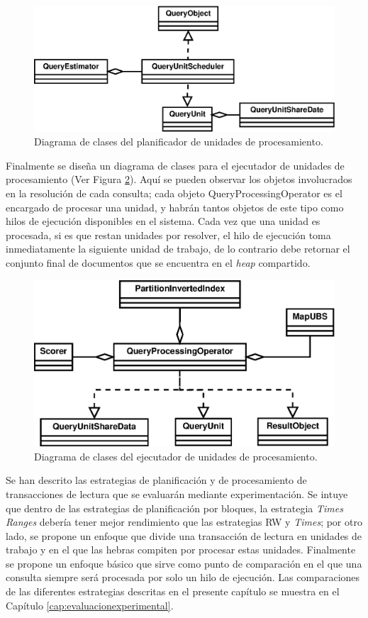 \begin{figure}[!th]
\centering
\includegraphics[scale=.75]{images/QueryUnitScheduler.eps}
\caption{Diagrama de clases del planificador de unidades de procesamiento.}
\label{fig:queryunit_scheduler}
\end{figure}


Finalmente se diseña un diagrama de clases para el ejecutador de unidades de procesamiento (Ver Figura \ref{fig:queryunit_executer}). Aquí se pueden observar los objetos involucrados en la resolución de cada consulta; cada objeto QueryProcessingOperator es el encargado de procesar una unidad, y habrán tantos objetos de este tipo como hilos de ejecución disponibles en el sistema. Cada vez que una unidad es procesada, si es que restan unidades por resolver, el hilo de ejecución toma inmediatamente la siguiente unidad de trabajo, de lo contrario debe retornar el conjunto final de documentos que se encuentra en el \textit{heap} compartido. 

\begin{figure}[!th]
\centering
\includegraphics[scale=.75]{images/QueryUnitExecuter.eps}
\caption{Diagrama de clases del ejecutador de unidades de procesamiento.}
\label{fig:queryunit_executer}
\end{figure}


Se han descrito las estrategias de planificación y de procesamiento de transacciones de lectura que se evaluarán mediante experimentación. Se intuye que dentro de las estrategias de planificación por bloques, la estrategia \textit{Times Ranges} debería tener mejor rendimiento que las estrategias RW y \textit{Times}; por otro lado, se propone un enfoque que divide una transacción de lectura en unidades de trabajo y en el que las hebras compiten por procesar estas unidades. Finalmente se propone un enfoque básico que sirve como punto de comparación en el que una consulta siempre será procesada por solo un hilo de ejecución. Las comparaciones de las diferentes estrategias descritas en el presente capítulo se muestra en el Capítulo \ref{cap:evaluacionexperimental}.